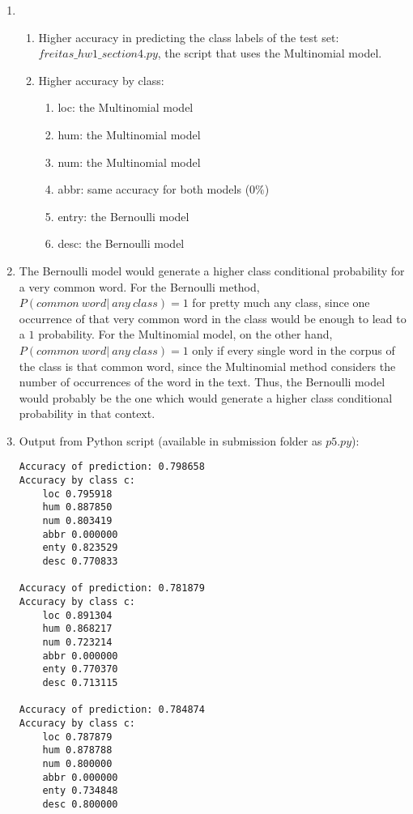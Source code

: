 \documentclass[11pt]{article}
\begin{document}
\begin {enumerate}
\item
\begin{enumerate}
\item
Higher accuracy in predicting the class labels of the test set: $freitas\_hw1\_section4.py$, the script that uses the Multinomial model.
\item
Higher accuracy by class:
\begin{enumerate}
\item
loc: the Multinomial model
\item
hum: the Multinomial model
\item
num: the Multinomial model
\item
abbr: same accuracy for both models ($0\%$)
\item
entry: the Bernoulli model
\item
desc: the Bernoulli model
\end{enumerate}
\end{enumerate}

\item
The Bernoulli model would generate a higher class conditional probability for a very common word. For the Bernoulli method, $P(common\ word|\ any\ class) = 1$ for pretty much any class, since one occurrence of that very common word in the class would be enough to lead to a $1$ probability.
\newline
\newline
For the Multinomial model, on the other hand, $P(common\ word|\ any\ class) = 1$ only if every single word in the corpus of the class is that common word, since the Multinomial method considers the number of occurrences of the word in the text. Thus, the Bernoulli model would probably be the one which would generate a higher class conditional probability in that context.

\item
Output from Python script (available in submission folder as $p5.py$):
\begin{verbatim}
Accuracy of prediction: 0.798658
Accuracy by class c:
    loc 0.795918
    hum 0.887850
    num 0.803419
    abbr 0.000000
    enty 0.823529
    desc 0.770833

Accuracy of prediction: 0.781879
Accuracy by class c:
    loc 0.891304
    hum 0.868217
    num 0.723214
    abbr 0.000000
    enty 0.770370
    desc 0.713115

Accuracy of prediction: 0.784874
Accuracy by class c:
    loc 0.787879
    hum 0.878788
    num 0.800000
    abbr 0.000000
    enty 0.734848
    desc 0.800000


\end{verbatim}
\end{enumerate}
\end{document}
